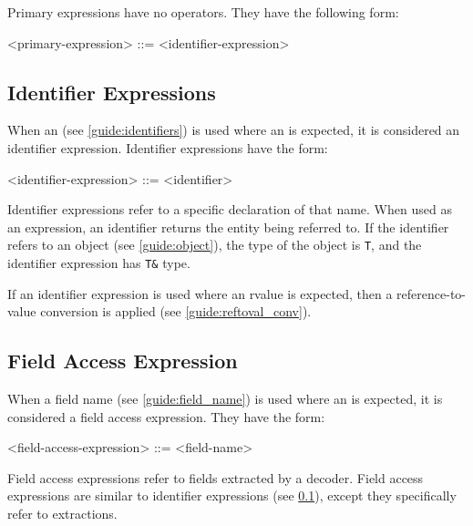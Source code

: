 Primary expressions have no operators. They have the following form:

\begin{minip}
\begin{grammar}
<primary-expression> ::= 
<identifier-expression>
\end{grammar}
\end{minip}

\subsection{Identifier Expressions} \label{guide:id_expr}

When an  (see \ref{guide:identifiers}) is used where an  is expected, it is considered an identifier expression. Identifier expressions have the form:

\begin{minip}
\begin{grammar}
<identifier-expression> ::= <identifier>
\end{grammar}
\end{minip}

Identifier expressions refer to a specific declaration of that name. When used as an expression, an identifier returns the entity being referred to. If the identifier refers to an object (see \ref{guide:object}), the type of the object is \texttt{T}, and the identifier expression has \texttt{T\&} type. 

If an identifier expression is used where an rvalue is expected, then a reference-to-value conversion is applied (see \ref{guide:reftoval_conv}).

\subsection{Field Access Expression} \label{guide:field_access_expr}

When a field name (see \ref{guide:field_name}) is used where an  is expected, it is considered a field access expression. They have the form:

\begin{minip}
\begin{grammar}
<field-access-expression> ::= <field-name>
\end{grammar}
\end{minip}

Field access expressions refer to fields extracted by a decoder. Field access expressions are similar to identifier expressions (see \ref{guide:id_expr}), except they specifically refer to extractions.

